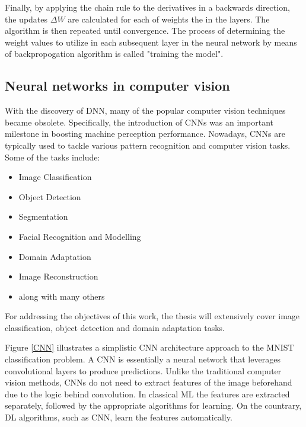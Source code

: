 \documentclass[english, 12pt, a4paper, elec, utf8, a-1b, online]{aaltothesis}
\begin{document}
Finally, by applying the chain rule to the derivatives in a backwards direction, the updates $\Delta W$ are calculated for each of weights the in the layers. \cite{Alber2018} The algorithm is then repeated until convergence. The process of determining the weight values to utilize in each subsequent layer in the neural network by means of backpropogation algorithm is called "training the model".  

\subsection{Neural networks in computer vision}
\label{neural_nets} 
With the discovery of DNN, many of the popular computer vision techniques became obsolete. Specifically, the introduction of CNNs was an important milestone in boosting machine perception performance. \cite{Mahony2019} Nowadays, CNNs are typically used to tackle various pattern recognition and computer vision tasks. Some of the tasks  include:

\begin{itemize}
	\item Image Classification
	\item Object Detection
	\item Segmentation
	\item Facial Recognition and Modelling
	\item Domain Adaptation
	\item Image Reconstruction
	\item along with many others \cite{paperswithcode:2022}
\end{itemize}

For addressing the objectives of this work, the thesis will extensively cover image classification, object detection and domain adaptation tasks.

Figure \ref{CNN} illustrates a simplistic CNN architecture approach to the MNIST \cite{lecun-mnisthandwrittendigit-2010} classification problem. A CNN is essentially a neural network that leverages convolutional layers to produce predictions. Unlike the traditional computer vision methods, CNNs do not need to extract features of the image beforehand due to the logic behind convolution. In classical ML the features are extracted separately, followed by the appropriate algorithms for learning. On the countrary, DL algorithms, such as CNN, learn the features automatically. \cite{alom01} 
\end{document}
